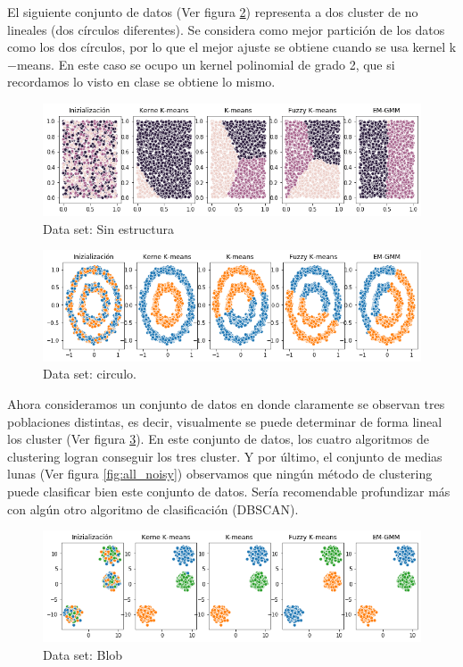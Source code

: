 \documentclass[paper=letter, fontsize=11pt]{scrartcl}
\numberwithin{equation}{section} %
\numberwithin{figure}{section} %
\numberwithin{table}{section} %
\begin{document}
El siguiente conjunto de datos (Ver figura \ref{fig:all_circle}) representa a dos cluster de no lineales (dos círculos diferentes). Se considera como mejor partición de los datos como los dos círculos, por lo que el mejor ajuste se obtiene cuando se usa kernel k$-$means. En este caso se ocupo un kernel polinomial de grado 2, que si recordamos lo visto en clase se obtiene lo mismo.


\begin{figure}[H]
    \centering
    \includegraphics[scale=0.7]{figure/all_no_structure.png}
    \caption{Data set: Sin estructura}
    \label{fig:all_no_structure}
\end{figure}

\begin{figure}[H]
    \centering
    \includegraphics[scale=0.7]{figure/all_circle.png}
    \caption{Data set: circulo.}
    \label{fig:all_circle}
\end{figure}

Ahora consideramos un conjunto de datos en donde claramente se observan tres poblaciones distintas, es decir, visualmente se puede determinar de forma lineal los cluster (Ver figura \ref{fig:all_blob}). En este conjunto de datos, los cuatro algoritmos de clustering logran conseguir los tres cluster. Y por último, el conjunto de medias lunas (Ver figura \ref{fig:all_noisy})
observamos que ningún método de clustering puede clasificar bien este conjunto de datos. Sería recomendable profundizar más con algún otro algoritmo de clasificación (DBSCAN).
\begin{figure}[H]
    \centering
    \includegraphics[scale=0.7]{figure/all_blob.png}
    \caption{Data set: Blob}
    \label{fig:all_blob}
\end{figure}
\end{document}
